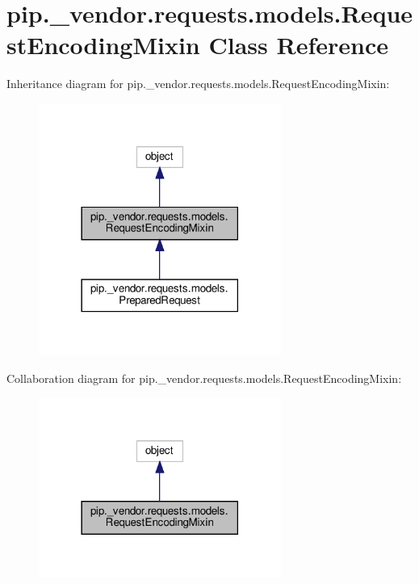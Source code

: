 \hypertarget{classpip_1_1__vendor_1_1requests_1_1models_1_1RequestEncodingMixin}{}\section{pip.\+\_\+vendor.\+requests.\+models.\+Request\+Encoding\+Mixin Class Reference}
\label{classpip_1_1__vendor_1_1requests_1_1models_1_1RequestEncodingMixin}


Inheritance diagram for pip.\+\_\+vendor.\+requests.\+models.\+Request\+Encoding\+Mixin\+:
\nopagebreak
\begin{figure}[H]
\begin{center}
\leavevmode
\includegraphics[width=225pt]{classpip_1_1__vendor_1_1requests_1_1models_1_1RequestEncodingMixin__inherit__graph}
\end{center}
\end{figure}


Collaboration diagram for pip.\+\_\+vendor.\+requests.\+models.\+Request\+Encoding\+Mixin\+:
\nopagebreak
\begin{figure}[H]
\begin{center}
\leavevmode
\includegraphics[width=225pt]{classpip_1_1__vendor_1_1requests_1_1models_1_1RequestEncodingMixin__coll__graph}
\end{center}
\end{figure}
